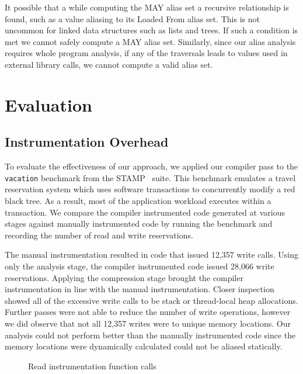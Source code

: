 \documentclass[preprint]{sigplanconf}
\begin{document}
It possible that a while computing the MAY alias set a recursive relationship is found, such as a value aliasing to its Loaded From alias set. This is not uncommon for linked data structures such as lists and trees. If such a condition is met we cannot safely compute a MAY alias set. Similarly, since our alias analysis requires whole program analysis, if any of the traversals leads to values used in external library calls, we cannot compute a valid alias set.

\section{Evaluation}

\subsection{Instrumentation Overhead}

To evaluate the effectiveness of our approach, we applied our compiler pass to the \verb+vacation+ benchmark from the STAMP~\cite{4636089} suite. This benchmark emulates a travel reservation system which uses software transactions to concurrently modify a red black tree. As a result, most of the application workload executes within a transaction. We compare the compiler instrumented code generated at various stages against manually instrumented code by running the benchmark and recording the number of read and write reservations.

The manual instrumentation resulted in code that issued 12,357 write calls. Using only the analysis stage,  the compiler instrumented code issued 28,066 write reservations. Applying the compression stage brought the compiler instrumentation in line with the manual instrumentation. Closer inspection showed all of the excessive write calls to be stack or thread-local heap allocations. Further passes were not able to reduce the number of write operations, however we did observe that not all 12,357 writes were to unique memory locations. Our analysis could not perform better than the manually instrumented code since the memory locations were dynamically calculated could not be aliased statically.

\begin{figure}
\caption{Read instrumentation function calls}\label{marker1}
\end{figure}
\end{document}

